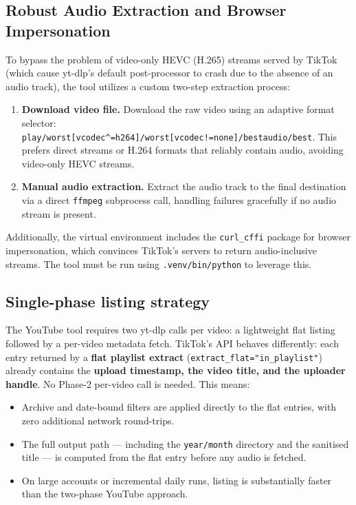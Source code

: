 \documentclass[11pt,a4paper]{report}
\newcommand{\code}[1]{\texttt{\small #1}}
\begin{document}
\subsection{Robust Audio Extraction and Browser Impersonation}

To bypass the problem of video-only HEVC (H.265) streams served by TikTok (which cause yt-dlp's default post-processor to crash due to the absence of an audio track), the tool utilizes a custom two-step extraction process:
\begin{enumerate}[leftmargin=1.6em]
  \item \textbf{Download video file.} Download the raw video using an adaptive format selector: \code{play/worst[vcodec\^{}=h264]/worst[vcodec!=none]/bestaudio/best}. This prefers direct streams or H.264 formats that reliably contain audio, avoiding video-only HEVC streams.
  \item \textbf{Manual audio extraction.} Extract the audio track to the final destination via a direct \code{ffmpeg} subprocess call, handling failures gracefully if no audio stream is present.
\end{enumerate}
Additionally, the virtual environment includes the \code{curl\_cffi} package for browser impersonation, which convinces TikTok's servers to return audio-inclusive streams. The tool must be run using \code{.venv/bin/python} to leverage this.

\subsection{Single-phase listing strategy}

The YouTube tool requires two yt-dlp calls per video: a lightweight flat listing
followed by a per-video metadata fetch.  TikTok's API behaves differently: each
entry returned by a \textbf{flat playlist extract}
(\code{extract\_flat="in\_playlist"}) already contains the \textbf{upload
timestamp, the video title, and the uploader handle}.  No Phase-2 per-video call
is needed.  This means:

\begin{itemize}[leftmargin=1.6em]
  \item Archive and date-bound filters are applied directly to the flat entries,
        with zero additional network round-trips.
  \item The full output path --- including the \code{year/month} directory and the
        sanitised title --- is computed from the flat entry before any audio is
        fetched.
  \item On large accounts or incremental daily runs, listing is substantially
        faster than the two-phase YouTube approach.
\end{itemize}
\end{document}
